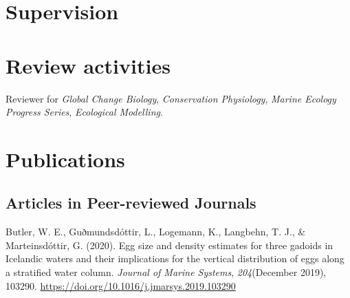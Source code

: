 \documentclass[11pt, a4paper]{awesome-cv}
\begin{document}
\hypertarget{supervision}{%
\section{Supervision}\label{supervision}}

\begin{cventries}
\end{cventries}

\hypertarget{review-activities}{%
\section{Review activities}\label{review-activities}}

Reviewer for \emph{Global Change Biology}, \emph{Conservation
Physiology}, \emph{Marine Ecology Progress Series}, \emph{Ecological
Modelling}.

\hypertarget{publications}{%
\section{Publications}\label{publications}}

\hypertarget{articles-in-peer-reviewed-journals}{%
\subsection{Articles in Peer-reviewed
Journals}\label{articles-in-peer-reviewed-journals}}

\hypertarget{refs_journals}{}
\leavevmode\hypertarget{ref-Butler2020}{}%
Butler, W. E., Guðmundsdóttir, L., Logemann, K., Langbehn, T. J., \&
Marteinsdóttir, G. (2020). Egg size and density estimates for three
gadoids in Icelandic waters and their implications for the vertical
distribution of eggs along a stratified water column. \emph{Journal of
Marine Systems}, \emph{204}(December 2019), 103290.
\url{https://doi.org/10.1016/j.jmarsys.2019.103290}
\end{document}

